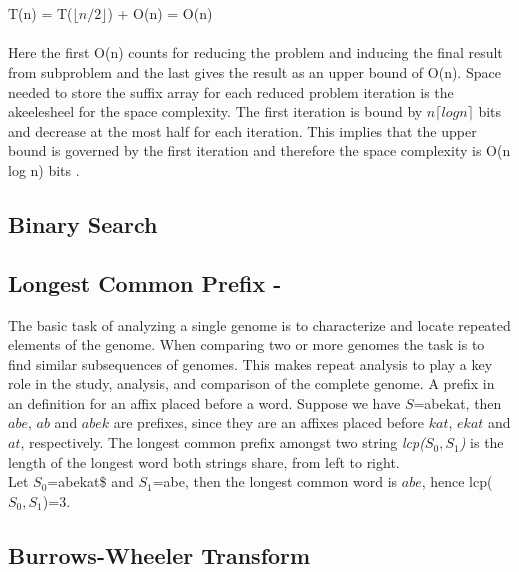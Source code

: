 \documentclass[12pt]{article} %
\begin{document}
\\ \\
T(n) = T($\lfloor n/2 \rfloor$) + O(n) = O(n)
\\ \\
Here the first O(n) counts for reducing the problem and inducing the final result from subproblem \cite{twoeffecient} and the last gives the result as an upper bound of O(n).
Space needed to store the suffix array for each reduced problem iteration is the akeelesheel for the space complexity. The first iteration is bound by $n \lceil log n \rceil$ bits and decrease at the most half for each iteration. This implies that the upper bound is governed by the first iteration and therefore the space complexity is O(n log n) bits \cite{twoeffecient}.

\subsection{Binary Search} \label{Binary Search Section}

\subsection{Longest Common Prefix - } \label{LCPsection}

The basic task of analyzing a single genome is to characterize and locate repeated elements of the genome. When comparing two or more genomes the task is to find similar subsequences of genomes. This makes repeat analysis to play a key role in the study, analysis, and comparison of the complete genome. 
A prefix in an definition for an affix placed before a word. Suppose we have $S$=abekat, then $abe$, $ab$ and $abek$ are prefixes, since they are an affixes placed before $kat$, $ekat$ and $at$, respectively. The longest common prefix amongst two string \emph{lcp($S_0, S_1$)} is the length of the longest word both strings share, from left to right. \\
Let $S_0$=abekat\$ and $S_1$=abe, then the longest common word is $abe$, hence lcp($S_0, S_1$)=3.

\subsection{Burrows-Wheeler Transform} \label{Burrows-Wheeler Transform}
\end{document}
